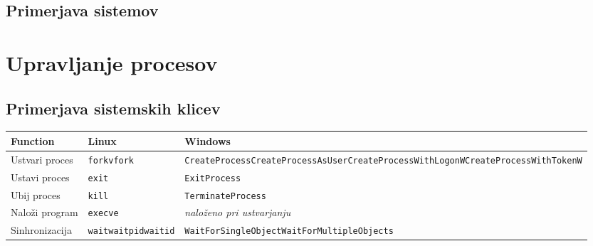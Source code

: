 \documentclass[a4paper,12pt,openright]{book}
\begin{document}
\section{Primerjava sistemov}

\chapter{Upravljanje procesov} \label{sec:process_control}

\section{Primerjava sistemskih klicev}

\begin{table}[h!]
	\begin{center}
		\begin{tabular}{ p{3.7cm}|p{2.5cm}|p{6cm} }
			Function          & Linux                                                  & Windows                                                                                                                                                                         \\
			\hline
			Ustvari proces    & \verb|fork|\newline\verb|vfork|                        & \verb|CreateProcess|\newline\verb|CreateProcessAsUser|\newline\verb|CreateProcessWithLogonW|\newline\verb|CreateProcessWithTokenW|                                              \\
			Ustavi proces     & \verb|exit|                                            & \verb|ExitProcess|                                                                                                                                                              \\
			Ubij proces       & \verb|kill|                                            & \verb|TerminateProcess|                                                                                                                                                         \\
			Naloži program   & \verb|execve|                                          & \textit{naloženo pri ustvarjanju}                                                                                                                                              \\
			Sinhronizacija    & \verb|wait|\newline\verb|waitpid|\newline\verb|waitid| & \verb|WaitForSingleObject|\newline\verb|WaitForMultipleObjects|                                                                                                                 \\

\end{tabular}
\end{center}
\end{table}
\end{document}
